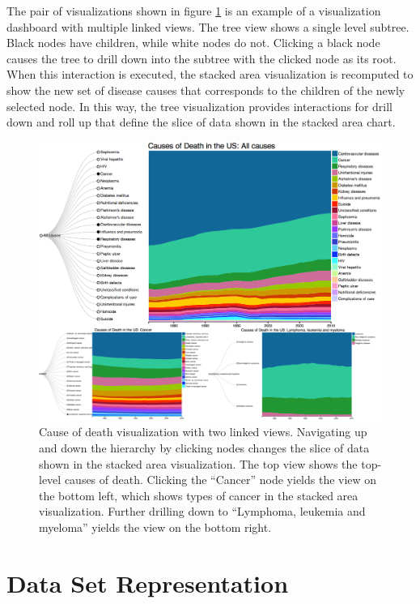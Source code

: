 The pair of visualizations shown in figure \ref{fig:mortalityVisV4} is an example of a visualization dashboard with multiple linked views. The tree view shows a single level subtree. Black nodes have children, while white nodes do not. Clicking a black node causes the tree to drill down into the subtree with the clicked node as its root. When this interaction is executed, the stacked area visualization is recomputed to show the new set of disease causes that corresponds to the children of the newly selected node. In this way, the tree visualization provides interactions for drill down and roll up that define the slice of data shown in the stacked area chart.

\begin{figure}
  \centering
  \includegraphics[width=\figureWidth]{figs/mortalityVisV4.png}
  \caption[CDC Mortality Visualization with Linked Views.]
   {Cause of death visualization with two linked views. Navigating up and down the hierarchy by clicking nodes changes the slice of data shown in the stacked area visualization. The top view shows the top-level causes of death. Clicking the ``Cancer'' node yields the view on the bottom left, which shows types of cancer in the stacked area visualization. Further drilling down to ``Lymphoma, leukemia and myeloma'' yields the view on the bottom right.}
  \label{fig:mortalityVisV4}
\end{figure}
\section{Data Set Representation}

